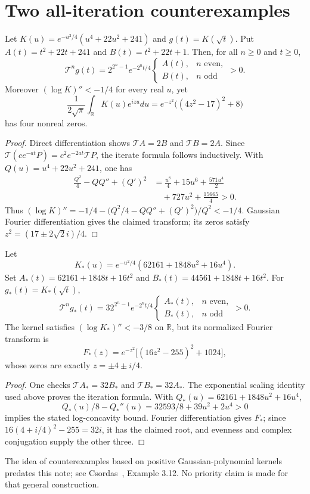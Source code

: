 \section{Two all-iteration counterexamples}

\begin{proposition}\label{prop:small}
Let $K(u)=e^{-u^2/4}(u^4+22u^2+241)$ and
$g(t)=K(\sqrt t)$. Put $A(t)=t^2+22t+241$
and $B(t)=t^2+22t+1$. Then, for all $n\ge0$
and $t\ge0$,
\[
\mathcal T^ng(t)=2^{2^n-1}e^{-2^nt/4}
\begin{cases}A(t),&n\text{ even},\\B(t),&n\text{ odd}\end{cases}>0.
\]
Moreover $(\log K)''<-1/4$ for every real $u$, yet
\[
\frac{1}{2\sqrt\pi}\int_{\mathbb R}K(u)e^{izu}du
=e^{-z^2}\big((4z^2-17)^2+8\big)
\]
has four nonreal zeros.
\end{proposition}
\begin{proof}
Direct differentiation shows
$\mathcal TA=2B$ and $\mathcal TB=2A$. Since
$\mathcal T(ce^{-at}P)=c^2e^{-2at}\mathcal TP$,
the iterate formula follows inductively.
With $Q(u)=u^4+22u^2+241$, one has
\begin{align*}
\frac{Q^2}4-QQ''+(Q')^2
&=\frac{u^8}4+15u^6+\frac{571u^4}2\\
&\quad+727u^2+\frac{15665}4>0.
\end{align*}
Thus $(\log K)''=-1/4-
\bigl(Q^2/4-QQ''+(Q')^2\bigr)/Q^2<-1/4$.
Gaussian Fourier differentiation gives the claimed transform;
its zeros satisfy $z^2=(17\pm2\sqrt2 i)/4$.
\end{proof}

\begin{proposition}
Let
\[
K_*(u)=e^{-u^2/4}(62161+1848u^2+16u^4).
\]
Set $A_*(t)=62161+1848t+16t^2$ and
$B_*(t)=44561+1848t+16t^2$.
For $g_*(t)=K_*(\sqrt t)$,
\[
\mathcal T^n g_*(t)=32^{2^n-1}e^{-2^nt/4}
\begin{cases}A_*(t),&n\text{ even},\\
B_*(t),&n\text{ odd}\end{cases}>0.
\]
The kernel satisfies $(\log K_*)''<-3/8$ on $\mathbb R$,
but its normalized Fourier transform is
\[
F_*(z)=e^{-z^2}\big[(16z^2-255)^2+1024\big],
\]
whose zeros are exactly $z=\pm4\pm i/4$.
\end{proposition}
\begin{proof}
One checks $\mathcal TA_*=32B_*$ and
$\mathcal TB_*=32A_*$. The exponential scaling identity
used above proves the iteration formula. With
$Q_*(u)=62161+1848u^2+16u^4$,
\[
Q_*(u)/8-Q_*''(u)=32593/8+39u^2+2u^4>0
\]
implies the stated log-concavity bound.
Fourier differentiation gives $F_*$; since
$16(4+i/4)^2-255=32i$, it has the claimed root,
and evenness and complex conjugation supply the other three.
\end{proof}

The idea of counterexamples based on positive
Gaussian-polynomial kernels predates this note; see
Csordas~\cite{Cs}, Example 3.12. No priority claim is made
for that general construction.
